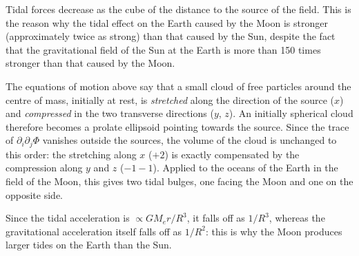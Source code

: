 \begin{points}
\item Tidal forces decrease as the cube of the distance to the source of the field. This is the reason why the tidal effect on the Earth caused by the Moon is stronger (approximately twice as strong) than that caused by the Sun, despite the fact that the gravitational field of the Sun at the Earth is more than 150 times stronger than that caused by the Moon.

\begin{carroll}
The equations of motion above say that a small cloud of free particles around the centre of mass, initially at rest, is \emph{stretched} along the direction of the source ($x$) and \emph{compressed} in the two transverse directions ($y$, $z$). An initially spherical cloud therefore becomes a prolate ellipsoid pointing towards the source. Since the trace of $\partial_i\partial_j\Phi$ vanishes outside the sources, the volume of the cloud is unchanged to this order: the stretching along $x$ ($+2$) is exactly compensated by the compression along $y$ and $z$ ($-1-1$). Applied to the oceans of the Earth in the field of the Moon, this gives two tidal bulges, one facing the Moon and one on the opposite side.

\begin{center}
\end{center}
Since the tidal acceleration is $\propto GM_e r/R^3$, it falls off as $1/R^3$, whereas the gravitational acceleration itself falls off as $1/R^2$: this is why the Moon produces larger tides on the Earth than the Sun.
\end{carroll}
\end{points}
